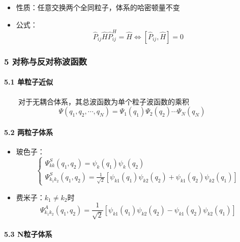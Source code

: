\documentclass[UTF8,twocolumn]{ctexart}
\providecommand{\tightlist}{%
  \setlength{\itemsep}{0pt}\setlength{\parskip}{0pt}}
\let\oldparagraph\paragraph
\renewcommand{\paragraph}[1]{\oldparagraph{#1}\mbox{}}
\begin{document}
\begin{itemize}
\tightlist
\item
  性质：任意交换两个全同粒子，体系的哈密顿量不变
\item
  公式：
  \[\hat{P}_{ij}\hat{H}\hat{P}_{ij}^H=\hat{H}\Leftrightarrow [\hat{P}_{ij},\hat{H}]=0\]
\end{itemize}

\hypertarget{ux5bf9ux79f0ux4e0eux53cdux5bf9ux79f0ux6ce2ux51fdux6570}{%
\subsubsection{5
对称与反对称波函数}\label{ux5bf9ux79f0ux4e0eux53cdux5bf9ux79f0ux6ce2ux51fdux6570}}

\hypertarget{ux5355ux7c92ux5b50ux8fd1ux4f3c}{%
\paragraph{ 5.1 单粒子近似}\label{ux5355ux7c92ux5b50ux8fd1ux4f3c}}

  对于无耦合体系，其总波函数为单个粒子波函数的乘积
\[\Psi(q_1,q_2,\cdots,q_N)=\Psi_1(q_1)\Psi_2(q_2)\cdots\Psi_N(q_N)\]

\hypertarget{ux4e24ux7c92ux5b50ux4f53ux7cfb}{%
\paragraph{ 5.2 两粒子体系}\label{ux4e24ux7c92ux5b50ux4f53ux7cfb}}

\begin{itemize}
\tightlist
\item
  玻色子： \[\begin{cases}
    \Psi_{kk}^S(q_1,q_2)=\psi_{k}(q_1)\psi_{k}(q_2) \\
    \Psi_{k_1k_2}^S(q_1,q_2)=\frac{1}{\sqrt{2}}[\psi_{k1}(q_1)\psi_{k2}(q_2)+\psi_{k1}(q_2)\psi_{k2}(q_1)]
  \end{cases}\]
\item
  费米子：\(k_1\neq k_2\)时
  \[\Psi_{k_1k_2}^A(q_1,q_2)=\frac{1}{\sqrt{2}}[\psi_{k1}(q_1)\psi_{k2}(q_2)-\psi_{k1}(q_2)\psi_{k2}(q_1)]\]
\end{itemize}

\hypertarget{nux7c92ux5b50ux4f53ux7cfb}{%
\paragraph{ 5.3 N粒子体系}\label{nux7c92ux5b50ux4f53ux7cfb}}
\end{document}
